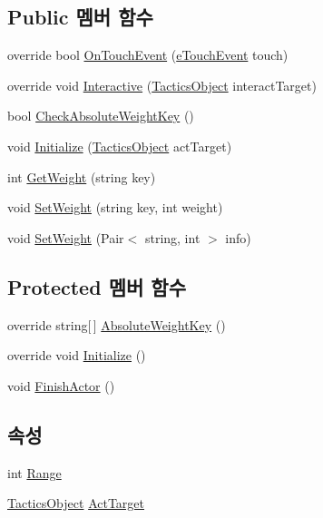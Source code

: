 \subsection*{Public 멤버 함수}
\begin{DoxyCompactItemize}
\item 
override bool \hyperlink{class_move_actor_abbb2fe6a87e45fe6a4f7eeec674558d6}{On\+Touch\+Event} (\hyperlink{_touch_manager_8cs_ae33e321a424fe84ba8b2fdb81ad40a68}{e\+Touch\+Event} touch)
\item 
override void \hyperlink{class_move_actor_ade9f1263ef53ad85968cf6cae50d6139}{Interactive} (\hyperlink{class_tactics_object}{Tactics\+Object} interact\+Target)
\item 
bool \hyperlink{class_m_c_n_1_1_actor_a493bb0a37cb9fc5b1aa8507ec69b04ac}{Check\+Absolute\+Weight\+Key} ()
\item 
void \hyperlink{class_m_c_n_1_1_actor_aadb5d1045def818bbcba4cd2248f2f1c}{Initialize} (\hyperlink{class_tactics_object}{Tactics\+Object} act\+Target)
\item 
int \hyperlink{class_m_c_n_1_1_actor_af264703ef93c3c77b5b7062aef828205}{Get\+Weight} (string key)
\item 
void \hyperlink{class_m_c_n_1_1_actor_a8d8020782aefa7fff625f5f8e09f7539}{Set\+Weight} (string key, int weight)
\item 
void \hyperlink{class_m_c_n_1_1_actor_a4337ef4d88c2086f18db4f2e6415eddd}{Set\+Weight} (Pair$<$ string, int $>$ info)
\end{DoxyCompactItemize}
\subsection*{Protected 멤버 함수}
\begin{DoxyCompactItemize}
\item 
override string\mbox{[}$\,$\mbox{]} \hyperlink{class_move_actor_a1039b1d985874bc3aace417e85bf6676}{Absolute\+Weight\+Key} ()
\item 
override void \hyperlink{class_move_actor_a5dadb0f5c892440b6a884da7ef56b538}{Initialize} ()
\item 
void \hyperlink{class_m_c_n_1_1_actor_ae86279ca7d290707cd010bc411f38966}{Finish\+Actor} ()
\end{DoxyCompactItemize}
\subsection*{속성}
\begin{DoxyCompactItemize}
\item 
int \hyperlink{class_move_actor_a4473f7867a074c8ca605220086c5d8fd}{Range}
\item 
\hyperlink{class_tactics_object}{Tactics\+Object} \hyperlink{class_m_c_n_1_1_actor_a4e2e573370bb52bb747f77d4c75dc7e1}{Act\+Target}
\end{DoxyCompactItemize}
